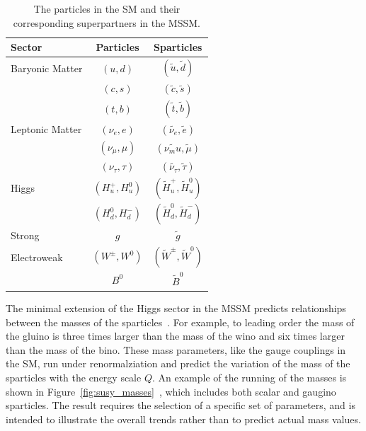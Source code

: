 \begin{table}
\centering
\begin{tabular}{lcc}
\hline
Sector & Particles & Sparticles \\
\hline
Baryonic Matter & $(u,d)$ & $(\tilde{u},\tilde{d})$ \\
                & $(c,s)$ & $(\tilde{c},\tilde{s})$ \\
                & $(t,b)$ & $(\tilde{t},\tilde{b})$ \\
Leptonic Matter & $(\nu_e,e)$ & $(\tilde{\nu_e},\tilde{e})$ \\
                & $(\nu_\mu,\mu)$ & $(\tilde{\nu_mu},\tilde{\mu})$ \\
                & $(\nu_\tau,\tau)$ & $(\tilde{\nu_\tau},\tilde{\tau})$ \\
Higgs           & $(H_u^+, H_u^0)$ & $(\tilde{H}_u^+, \tilde{H}_u^0)$ \\
                & $(H_d^0, H_d^-)$ & $(\tilde{H}_d^0, \tilde{H}_d^-)$ \\
Strong          & $g$ & $\tilde{g}$ \\
Electroweak     & $(W^\pm, W^0)$ & $(\tilde{W}^\pm, \tilde{W}^0)$ \\
                & $B^0$ & $\tilde{B}^0$ \\
\end{tabular}
\caption{The particles in the \acs*{SM} and their corresponding superpartners in the \acs*{MSSM}.}
\label{tab:sparticles}
\end{table}

The minimal extension of the Higgs sector in the \ac{MSSM} predicts relationships between the masses of the sparticles~\cite{susy_primer}.
For example, to leading order the mass of the gluino is three times larger than the mass of the wino and six times larger than the mass of the bino.
These mass parameters, like the gauge couplings in the \ac{SM}, run under renormalziation and predict the variation of the mass of the sparticles with the energy scale $Q$.
An example of the running of the masses is shown in Figure~\ref{fig:susy_masses}~\cite{susy_primer}, which includes both scalar and gaugino sparticles.
The result requires the selection of a specific set of parameters, and is intended to illustrate the overall trends rather than to predict actual mass values.


